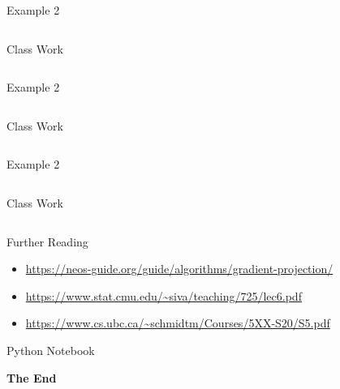 \documentclass[aspectratio=169,xcolor=dvipsnames,svgnames,x11names,fleqn]{beamer}
\begin{document}
\begin{frame}{Example 2}
    \begin{columns}

    {\color{lightgray}Class Work}

    \end{columns}
\end{frame}

\begin{frame}{Example 2}
    \begin{columns}

    {\color{lightgray}Class Work}

    \end{columns}
\end{frame}


\begin{frame}{Example 2}
    \begin{columns}

    {\color{lightgray}Class Work}

    \end{columns}
\end{frame}



\begin{frame}{Further Reading}
\begin{itemize}
\item \url{https://neos-guide.org/guide/algorithms/gradient-projection/}
\item \url{https://www.stat.cmu.edu/~siva/teaching/725/lec6.pdf}
\item \url{https://www.cs.ubc.ca/~schmidtm/Courses/5XX-S20/S5.pdf}
\end{itemize}
\end{frame}

    
    \begin{frame}[containsverbatim]{Python Notebook}
    \begin{center}
    \small
    { }
    
    \end{center}
    \end{frame}
    
    
    \begin{frame}
        \Huge{\centerline{\color{MediumBlue}\textbf{The End}}}
    \end{frame}
\end{document}
